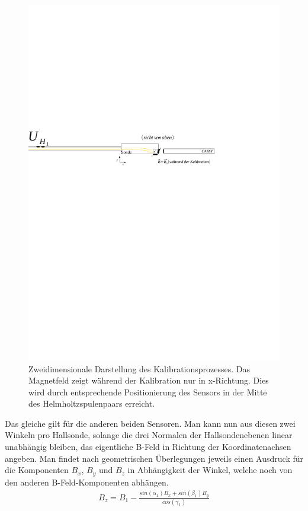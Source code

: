 \documentclass[12pt,a4paper]{article}
\begin{document}
\begin{figure}[H]
	\centering
	\includegraphics[scale=1.3]{kalib_skizze1.pdf}
	\caption{Zweidimensionale Darstellung des Kalibrationsprozesses. Das Magnetfeld zeigt während der Kalibration nur in x-Richtung. Dies wird durch entsprechende Positionierung des Sensors in der Mitte des Helmholtzspulenpaars erreicht.}
	\label{fig:kalib}
\end{figure}
Das gleiche gilt für die anderen beiden Sensoren. Man kann nun aus diesen zwei Winkeln pro Hallsonde, solange die drei Normalen der Hallsondenebenen linear unabhängig bleiben, das eigentliche B-Feld in Richtung der Koordinatenachsen angeben. Man findet nach geometrischen Überlegungen jeweils einen Ausdruck für die Komponenten $B_x$, $B_y$ und $B_z$ in Abhängigkeit der Winkel, welche noch von den anderen B-Feld-Komponenten abhängen.
\begin{align*}
B_z = B_1-\frac{sin(\alpha_1)B_x+sin(\beta_1)B_y}{cos(\gamma_1)}
\end{align*}
\end{document}
